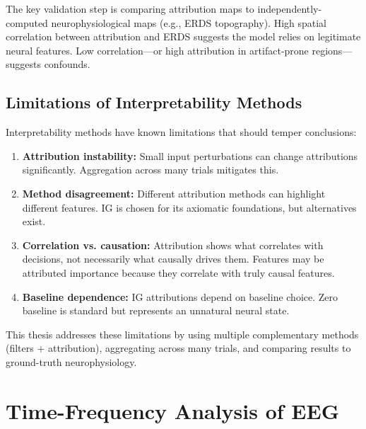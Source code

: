 The key validation step is comparing attribution maps to independently-computed neurophysiological maps (e.g., ERDS topography). High spatial correlation between attribution and ERDS suggests the model relies on legitimate neural features. Low correlation—or high attribution in artifact-prone regions—suggests confounds.


\subsection{Limitations of Interpretability Methods}
\label{subsec:bg_interpretability_limits}

Interpretability methods have known limitations that should temper conclusions:

\begin{enumerate}
    \item \textbf{Attribution instability:} Small input perturbations can change attributions significantly. Aggregation across many trials mitigates this.
    
    \item \textbf{Method disagreement:} Different attribution methods can highlight different features. IG is chosen for its axiomatic foundations, but alternatives exist.
    
    \item \textbf{Correlation vs. causation:} Attribution shows what correlates with decisions, not necessarily what causally drives them. Features may be attributed importance because they correlate with truly causal features.
    
    \item \textbf{Baseline dependence:} IG attributions depend on baseline choice. Zero baseline is standard but represents an unnatural neural state.
\end{enumerate}

This thesis addresses these limitations by using multiple complementary methods (filters + attribution), aggregating across many trials, and comparing results to ground-truth neurophysiology.


\section{Time-Frequency Analysis of EEG}
\label{sec:bg_time_freq}


